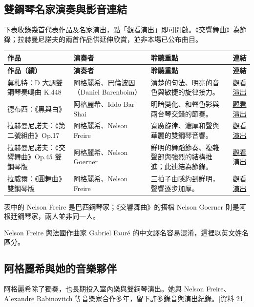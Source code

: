 \documentclass[UTF8,12pt,a4paper,fontset=none]{ctexart}
\newcommand{\src}[1]{{\small\color{accent}[資料 #1]}}
\begin{document}
\subsection{雙鋼琴名家演奏與影音連結}
\label{sec:duo-videos}
下表收錄幾首代表作品及名家演出，點「觀看演出」即可開啟。《交響舞曲》為節錄；拉赫曼尼諾夫的兩首作品供延伸欣賞，並非本場已公布曲目。

\begingroup
\small
{}
\setlength{\tabcolsep}{4pt}
\setlength{\LTleft}{0pt}
\setlength{\LTright}{0pt}
\begin{longtable}{@{}>{\raggedright\arraybackslash}p{}>{\raggedright\arraybackslash}p{}>{\raggedright\arraybackslash}p{}>{\raggedright\arraybackslash}p{}@{}}
\toprule
\textbf{作品} & \textbf{演奏者} & \textbf{聆聽重點} & \textbf{連結}\\
\midrule
\endfirsthead
\toprule
\textbf{作品（續）} & \textbf{演奏者} & \textbf{聆聽重點} & \textbf{連結}\\
\midrule
\endhead
\bottomrule
\endfoot
莫札特：D 大調雙鋼琴奏鳴曲 K.448 & 阿格麗希、巴倫波因（Daniel Barenboim） & 清楚的句法、明亮的音色與敏捷的旋律接力。 & \href{https://youtu.be/USl7qUWU33k}{觀看演出}\\[6pt]
德布西：《黑與白》 & 阿格麗希、Iddo Bar-Shai & 明暗變化、和聲色彩與兩台琴交錯的節奏。 & \href{https://youtu.be/HHZ3RYAHq20}{觀看演出}\\[6pt]
拉赫曼尼諾夫：《第二號組曲》Op.17 & 阿格麗希、Nelson Freire & 寬廣旋律、濃厚和聲與華麗的雙鋼琴音響。 & \href{https://youtu.be/wYLasmJdeEg}{觀看演出}\\[6pt]
拉赫曼尼諾夫：《交響舞曲》Op.45 雙鋼琴版 & 阿格麗希、Nelson Goerner & 鮮明的舞蹈節奏、複雜聲部與強烈的結構推進；此連結為節錄。 & \href{https://vimeo.com/27052613}{觀看演出}\\[6pt]
拉威爾：《圓舞曲》雙鋼琴版 & 阿格麗希、Nelson Freire & 三拍子由隱約到鮮明，聲響逐步加厚。 & \href{https://youtu.be/Q0Qo1anGvfQ}{觀看演出}\\
\end{longtable}
\endgroup

表中的 Nelson Freire 是巴西鋼琴家；《交響舞曲》的搭檔 Nelson Goerner 則是阿根廷鋼琴家，兩人並非同一人。

Nelson Freire 與法國作曲家 Gabriel Fauré 的中文譯名容易混淆，這裡以英文姓名區分。

\subsection{阿格麗希與她的音樂夥伴}
阿格麗希除了獨奏，也長期投入室內樂與雙鋼琴演出。她與 Nelson Freire、Alexandre Rabinovitch 等音樂家合作多年，留下許多錄音與演出紀錄。\src{21}
\end{document}

